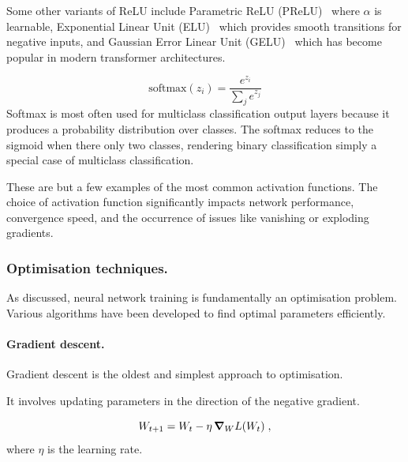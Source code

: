 \begin{description}
                    Some other variants of ReLU include Parametric ReLU (PReLU)~\cite{he_delving_2015} where \(\alpha\) is learnable, Exponential Linear Unit (ELU)~\cite{clevert_fast_2016} which provides smooth transitions for negative inputs, and Gaussian Error Linear Unit (GELU)~\cite{hendrycks_gaussian_2023} which has become popular in modern transformer architectures.

                \item[Softmax:] \[\text{softmax}(z_i) = \frac{e^{z_i}}{\sum_{j} e^{z_j}}\]
                        Softmax is most often used for multiclass classification output layers because it produces a probability distribution over classes.
                        The softmax reduces to the sigmoid when there only two classes, rendering binary classification simply a special case of multiclass classification.
            \end{description}
            
            These are but a few examples of the most common activation functions.
            The choice of activation function significantly impacts network performance, convergence speed, and the occurrence of issues like vanishing or exploding gradients.
            
        \subsubsection{Optimisation techniques.}
        \label{subsubsec:optimisation-techniques}
            As discussed, neural network training is fundamentally an optimisation problem.
            Various algorithms have been developed to find optimal parameters efficiently.
            
            \paragraph{Gradient descent.}
            Gradient descent is the oldest and simplest approach to optimisation.
            
            It involves updating parameters in the direction of the negative gradient.
            
           \begin{equation}
                W_{t+1} = W_t - \eta \,\grad_W L(W_t)\;,
           \end{equation}
            where \(\eta\) is the learning rate.
            

